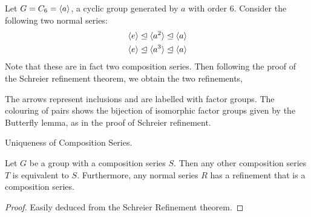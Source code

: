 \documentclass[../../book.tex]{subfiles}
\begin{document}
\begin{eg} 
    
    Let $G = C_6 = \langle a\rangle$, a cyclic group generated by $a$ with order $6$. 
    Consider the following two normal series: \begin{align*}
        \langle e\rangle \trianglelefteq \langle a^2\rangle \trianglelefteq \langle a\rangle \\
        \langle e\rangle \trianglelefteq \langle a^3\rangle \trianglelefteq \langle a\rangle
    \end{align*}
    Note that these are in fact two composition series. 
    Then following the proof of the Schreier refinement theorem, 
    we obtain the two refinements, \begin{figure}[H]
        \centering
    \end{figure}
    The arrows represent inclusions and are labelled with factor groups.
    The colouring of pairs shows the bijection of isomorphic factor groups
    given by the Butterfly lemma, as in the proof of Schreier refinement.
\end{eg}
\begin{thm} Uniqueness of Composition Series.
    
    Let $G$ be a group with a composition series $S$.
    Then any other composition series $T$ is equivalent to $S$.
    Furthermore, any normal series $R$ has a refinement that is a composition series.
    
\end{thm}
\begin{proof}
    
    Easily deduced from the Schreier Refinement theorem.
    
\end{proof}
\end{document}
